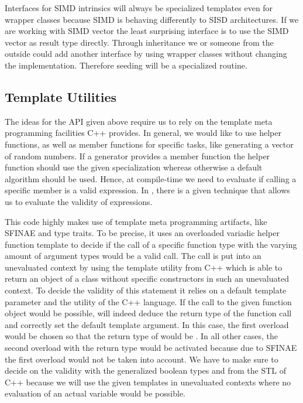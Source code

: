 \documentclass{stdlocal}
\begin{document}
    Interfaces for SIMD intrinsics will always be specialized templates even for wrapper classes because SIMD is behaving differently to SISD architectures.
    If we are working with SIMD vector the least surprising interface is to use the SIMD vector as result type directly.
    Through inheritance we or someone from the outside could add another interface by using wrapper classes without changing the implementation.
    Therefore seeding will be a specialized routine.

  \subsection{Template Utilities} %
  \label{sub:utilities}
    The ideas for the API given above require us to rely on the template meta programming facilities C++ provides.
    In general, we would like to use helper functions, as well as member functions for specific tasks, like generating a vector of random numbers.
    If a generator provides a member function the helper function should use the given specialization whereas otherwise a default algorithm should be used.
    Hence, at compile-time we need to evaluate if calling a specific member is a valid expression.
    In \textcite{vandevoorde2018}, there is a given technique that allows us to evaluate the validity of expressions.

    This code highly makes use of template meta programming artifacts, like SFINAE and type traits.
    To be precise, it uses an overloaded variadic helper function template  to decide if the call of a specific function type  with the varying amount of argument types  would be a valid call.
    The call is put into an unevaluated context by using the  template utility from C++ which is able to return an object of a class without specific constructors in such an unevaluated context.
    To decide the validity of this statement it relies on a default template parameter and the  utility of the C++ language.
    If the call to the given function object would be possible,  will indeed deduce the return type of the function call and correctly set the default template argument.
    In this case, the first overload would be chosen so that the return type of  would be .
    In all other cases, the second overload with the return type  would be activated because due to SFINAE the first overload would not be taken into account.
    We have to make sure to decide on the validity with the generalized boolean types  and  from the STL of C++ because we will use the given templates in unevaluated contexts where no evaluation of an actual  variable would be possible.
\end{document}
